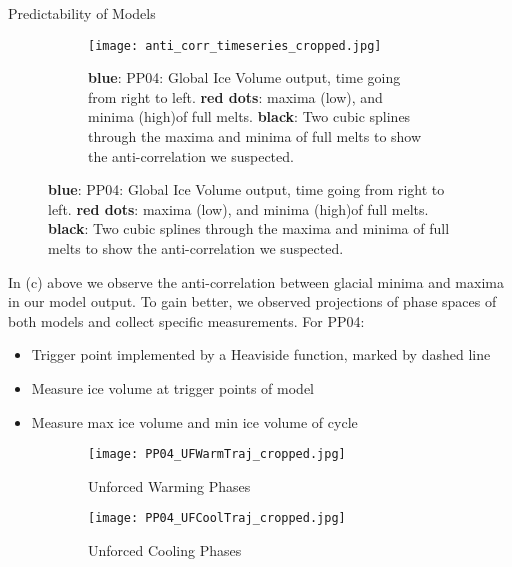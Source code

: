 \documentclass[final]{beamer}
\newlength{\onecolwid}
\begin{document}
\begin{frame}[t]
\begin{columns}[t]
\begin{column}{\onecolwid}
\begin{block}{Predictability of Models}
\begin{figure}
\begin{subfigure}{.5\textwidth}
        \end{subfigure}
        \begin{subfigure}{\textwidth}
        \begin{center}
        \texttt{[image: anti\_corr\_timeseries\_cropped.jpg]}
        \caption{\textbf{blue}: PP04: Global Ice Volume output, time going from right to left. \textbf{red dots}: maxima (low), and minima (high)of full melts. \textbf{black}: Two cubic splines through the maxima and minima of full melts to show the anti-correlation we suspected.}
        \end{center}
        \end{subfigure}%
      \end{figure}
		In (c) above we observe the anti-correlation between glacial minima and maxima in our model output. To gain better, we observed projections of phase spaces of both models and collect specific measurements. For PP04:
		\begin{itemize}
		\small \item Trigger point implemented by a Heaviside function, marked by dashed line
		\small \item Measure ice volume at trigger points of model
		\small \item Measure max ice volume and min ice volume of cycle
		\end{itemize}
      	\begin{figure}
      	\centering
      	\begin{subfigure}{.5\textwidth}
      		\centering
      		\texttt{[image: PP04\_UFWarmTraj\_cropped.jpg]}
      		\caption{Unforced Warming Phases}
      		\label{4a}
      	\end{subfigure}%
      	\begin{subfigure}{.5\textwidth}
      		\centering
			\texttt{[image: PP04\_UFCoolTraj\_cropped.jpg]}
      		\caption{Unforced Cooling Phases}
      		\label{4b}
      	\end{subfigure}
      	\begin{subfigure}{.5\textwidth}
      		\centering

\end{subfigure}
\end{figure}
\end{block}
\end{column}
\end{columns}
\end{frame}
\end{document}
